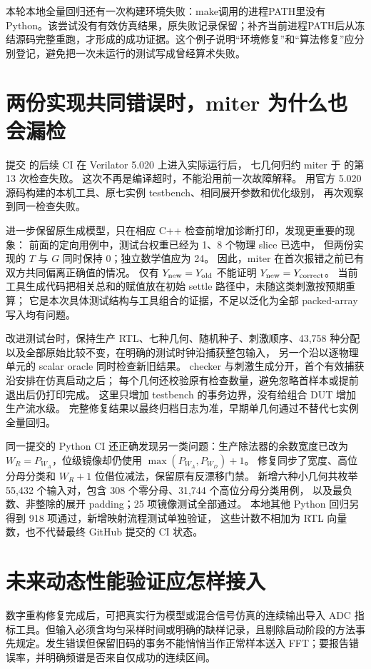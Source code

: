 本轮本地全量回归还有一次构建环境失败：make调用的进程PATH里没有Python。该尝试没有有效仿真结果，原失败记录保留；补齐当前进程PATH后从冻结源码完整重跑，才形成的成功证据。这个例子说明“环境修复”和“算法修复”应分别登记，避免把一次未运行的测试写成曾经算术失败。

\section{两份实现共同错误时，miter 为什么也会漏检}
提交  的后续 CI 在 Verilator 5.020 上进入实际运行后，
七几何归约 miter 于  的第 13 次检查失败。
这次不再是编译超时，不能沿用前一次故障解释。
用官方 5.020 源码构建的本机工具、原七实例 testbench、相同展开参数和优化级别，
再次观察到同一检查失败。

进一步保留原生成模型，只在相应 C++ 检查前增加诊断打印，发现更重要的现象：
前面的定向用例中，测试台权重已经为 1、8 个物理 slice 已选中，
但两份实现的 \(T\) 与 \(G\) 同时保持 0；独立数学值应为 24。
因此，miter 在首次报错之前已有双方共同偏离正确值的情况。
仅有 \(Y_{\rm new}=Y_{\rm old}\) 不能证明 \(Y_{\rm new}=Y_{\rm correct}\)。
当前工具生成代码把相关总和的赋值放在初始 settle 路径中，未随这类刺激按预期重算；
它是本次具体测试结构与工具组合的证据，不足以泛化为全部 packed-array 写入均有问题。

改进测试台时，保持生产 RTL、七种几何、随机种子、刺激顺序、43,758 种分配
以及全部原始比较不变，在明确的测试时钟沿捕获整包输入，
另一个沿以逐物理单元的 scalar oracle 同时检查新旧结果。
checker 与刺激生成分开，首个有效捕获沿安排在仿真启动之后；
每个几何还校验原有检查数量，避免忽略首样本或提前退出后仍打印完成。
这里只增加 testbench 的事务边界，没有给组合 DUT 增加生产流水级。
完整修复结果以最终归档日志为准，早期单几何通过不替代七实例全量回归。

同一提交的 Python CI 还正确发现另一类问题：生产除法器的余数宽度已改为
\(W_R=P_{W_A}\)，位级镜像却仍使用 \(\max(P_{W_A},P_{W_D})+1\)。
修复同步了宽度、高位分母分类和 \(W_R+1\) 位借位减法，保留原有反漂移门禁。
新增六种小几何共枚举 55,432 个输入对，包含 308 个零分母、31,744 个高位分母分类用例，
以及最负数、非整除的展开 padding；25 项镜像测试全部通过。
本地其他 Python 回归另得到 918 项通过，新增映射流程测试单独验证，
这些计数不相加为 RTL 向量数，也不代替最终 GitHub 提交的 CI 状态。

\section{未来动态性能验证应怎样接入}
数字重构修复完成后，可把真实行为模型或混合信号仿真的连续输出导入 ADC 指标工具。但输入必须含均匀采样时间或明确的缺样记录，且剔除启动阶段的方法事先规定。发生错误但保留旧码的事务不能悄悄当作正常样本送入 FFT；要报告错误率，并明确频谱是否来自仅成功的连续区间。

